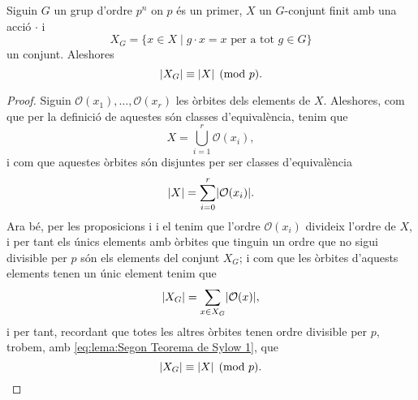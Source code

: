 \documentclass[../Apunts.tex]{subfiles}
\begin{document}
	\begin{lemma}
		\label{lema:Segon Teorema de Sylow}
		Siguin \(G\) un grup d'ordre \(p^{n}\) on \(p\) és un primer, \(X\) un \(G\)-conjunt finit amb una acció \(\cdot\) i
		\[X_{G}=\{x\in X\mid g\cdot x=x\text{ per a tot }g\in G\}\]
		un conjunt. Aleshores
		\[\abs{X_{G}}\equiv\abs{X}\pmod{p}.\]
		\begin{proof}
			Siguin \(\mathcal{O}(x_{1}),\dots,\mathcal{O}(x_{r})\) les òrbites dels elements de \(X\). Aleshores, com que per la definició de  aquestes són classes d'equivalència, tenim que %
			\[X=\bigcup_{i=1}^{r}\mathcal{O}(x_{i}),\]
			i com que aquestes òrbites són disjuntes per ser classes d'equivalència
			\begin{equation}
		\label{eq:lema:Segon Teorema de Sylow 1}
			\abs{X}=\sum_{i=0}^{r}\abs{\mathcal{O}(x_{i})}.
			\end{equation}
			Ara bé, per les proposicions  i  i el  tenim que l'ordre \(\mathcal{O}(x_{i})\) divideix l'ordre de \(X\), i per tant els únics elements amb òrbites que tinguin un ordre que no sigui divisible per \(p\) són els elements del conjunt \(X_{G}\); i com que les òrbites d'aquests elements tenen un únic element tenim que
			\[\abs{X_{G}}=\sum_{x\in X_{G}}\abs{\mathcal{O}(x)},\]
			i per tant, recordant que totes les altres òrbites tenen ordre divisible per \(p\), trobem, amb \eqref{eq:lema:Segon Teorema de Sylow 1}, que
			\[\abs{X_{G}}\equiv\abs{X}\pmod{p}.\qedhere\]
		\end{proof}
	\end{lemma}
\end{document}
